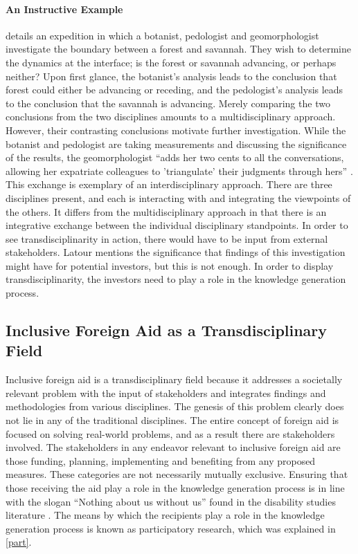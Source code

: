 \documentclass[a4paper]{article}
\begin{document}
\paragraph{An Instructive Example}

\cite{latour1999circulating} details an expedition in which a botanist,
pedologist and geomorphologist investigate the boundary between a forest and
savannah. They wish to determine the dynamics at the interface; is the forest
or savannah advancing, or perhaps neither? Upon first glance, the botanist's
analysis leads to the conclusion that forest could either be advancing or
receding, and the pedologist's analysis leads to the conclusion that the
savannah is advancing. Merely comparing the two conclusions from the two
disciplines amounts to a multidisciplinary approach. However, their
contrasting conclusions motivate further investigation. While the botanist and
pedologist are taking measurements and discussing the significance of the
results, the geomorphologist ``adds her two cents to all the conversations,
allowing her expatriate colleagues to 'triangulate' their judgments through
hers'' \citep{latour1999circulating}. This exchange is exemplary of an
interdisciplinary approach. There are three disciplines present, and each is
interacting with and integrating the viewpoints of the others. It differs from
the multidisciplinary approach in that there is an integrative exchange
between the individual disciplinary standpoints. In order to see
transdisciplinarity in action, there would have to be input from external
stakeholders. Latour mentions the significance that findings of this
investigation might have for potential investors, but this is not enough. In
order to display transdisciplinarity, the investors need to play a role in the
knowledge generation process.

\subsection{Inclusive Foreign Aid as a Transdisciplinary Field}

Inclusive foreign aid is a transdisciplinary field because it addresses a
societally relevant problem with the input of stakeholders and integrates
findings and methodologies from various disciplines. The genesis of this
problem clearly does not lie in any of the traditional disciplines. The entire
concept of foreign aid is focused on solving real-world problems, and as a
result there are stakeholders involved. The stakeholders in any endeavor
relevant to inclusive foreign aid are those funding, planning, implementing
and benefiting from any proposed measures. These categories are not
necessarily mutually exclusive. Ensuring that those receiving the aid play a
role in the knowledge generation process is in line with the slogan ``Nothing
about us without us'' found in the disability studies literature
\citep{pfeiffer2000disability}. The means by which the recipients play a role
in the knowledge generation process is known as participatory research, which
was explained in \autoref{part}.
\end{document}
